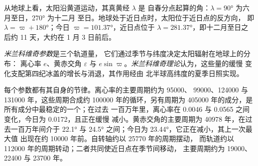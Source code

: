 从地球上看，太阳沿黄道运动，其真黄经 $\lambda$ 是
自春分点起算的角：$\lambda = \ang{90}$ 为六月至日，\ang{270} 为十二月
至日。地球处于近日点时，太阳位于近日点的反方向，
即 $\lambda = \varpi + \ang{180}$；今日 $\varpi = \ang{101.37}$，近日点位于
$\lambda = \ang{281.37}$，即十二月至日之后约 11 天，大约在 1 月 3 日前后。

\begin{definition}[米兰科维奇参数]\label{def:b2:orbital-forcing:milankovitch}
\emph{米兰科维奇参数}是三个轨道量，
它们通过季节与纬度决定太阳辐射在地球上的分布：
离心率 $e$、黄赤交角 $\varepsilon$ 与
$e\sin\varpi$。\emph{米兰科维奇理论}认为，这些量的缓慢
变化支配第四纪冰盖的增长与消退，其作用经由
北半球高纬度的夏季日照实现。
\end{definition}

每个参数都有其自身的节律。离心率的主要周期约为 \num{95000}、
\num{99000}、\num{124000} 与 \num{131000} 年，这些周期合成约
\num{100000} 年的循环，另有周期为 \num{405000} 年的成分，是所有成分中最稳定的一个；在过去
一百万年里，离心率在 \num{0.0046} 与 \num{0.0565} 之间变化，今日为 \num{0.0172}，且正在缓慢
减小。黄赤交角的主要周期为 \num{40978} 年，在过去一百万年间介于 \ang{22.1}
与 \ang{24.5} 之间；今日为 \ang{23.44}，它正在减小，其上一次最大值
出现在约 \num{10000} 年前。自转轴约以 \num{25770} 年的周期摆动，
而轨道约以 \num{112000} 年的周期转动；二者共同使近日点在季节间移动，
主要周期约为 \num{19000}、\num{22400} 与 \num{23700} 年。

